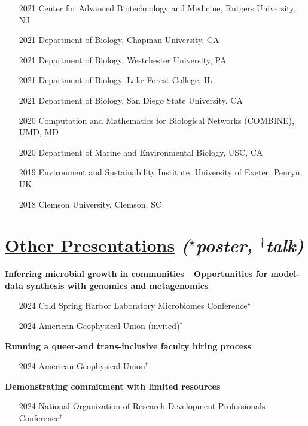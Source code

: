 \documentclass[]{res}
\begin{document}
\begin{resume}
\begin{enumerate}
\item[2021] Center for Advanced Biotechnology and Medicine, Rutgers University, NJ
\item[2021] Department of Biology, Chapman University, CA
\item[2021] Department of Biology, Westchester University, PA
\item[2021] Department of Biology, Lake Forest College, IL
\item[2021] Department of Biology, San Diego State University, CA
\item[2020] Computation and Mathematics for Biological Networks (COMBINE), UMD, MD
\item[2020] Department of Marine and Environmental Biology, USC, CA
\item[2019] Environment and Sustainability Institute, University of Exeter, Penryn, UK
\item[2018] Clemson University, Clemson, SC
\end{enumerate}



 \section{\underline{Other Presentations} \emph{{($^{\star}$poster, $^{\dagger}$talk)}}} 
 
 {\bf Inferring microbial growth in communities—Opportunities for model-data synthesis
with genomics and metagenomics}

 \begin{itemize}
 \item[2024] Cold Spring Harbor Laboratory Microbiomes Conference$^{\star}$
 \item[2024] American Geophysical Union (invited)$^{\dagger}$
 \end{itemize}  
 
  {\bf Running a queer-and trans-inclusive faculty hiring process}
  
 \begin{itemize}
 \item[2024] American Geophysical Union$^{\dagger}$
 \end{itemize}  
 
 {\bf Demonstrating commitment with limited resources}
 
 \begin{itemize}
 \item[2024] National Organization of Research Development Professionals Conference$^{\dagger}$
 \end{itemize} 
 

\end{resume}
\end{document}
